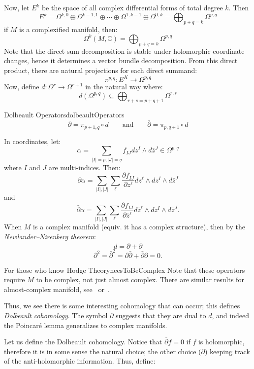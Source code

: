 \documentclass{book}
\newcommand{\C}{{\mathbb{C}}}
\newcommand{\sse}{\subseteq}
\begin{document}
Now, let $E^k$ be the space of all complex differential forms of total degree $k$. Then
\[
  E^k = \Omega^{k,0} \oplus \Omega^{k-1, 1}\oplus \cdots \oplus \Omega^{1, k-1}\oplus \Omega^{0,k}
  = \bigoplus_{p+q=k} \Omega^{p,q}
\]
if $M$ is a complexified manifold, then:
\[
  \Omega^k(M, \C) = \bigoplus_{p+q=k} \Omega^{p,q}
\]
Note that the direct sum decomposition is stable under holomorphic coordinate changes, hence it determines
a vector bundle decomposition. From this direct product, there are natural projections for each direct summand:
\[
  \pi^{p,q}: E^K \to \Omega^{p,q}
\]
Now, define $d: \Omega^r \to \Omega^{r+1}$ in the natural way where:
\[
  d(\Omega^{p,q}) \sse \bigoplus_{r+s=p+q+1} \Omega^{r,s}
\]
\begin{defn}{Dolbeault Operators}{dolbeaultOperators}
  \[
    \partial = \pi_{p+1, q}\circ d \qquad \text{and} \qquad \overline{\partial} = \pi_{p, q+1}\circ d
  \]
\end{defn}
In coordinates, let:
\[
    \alpha = \sum_{|I|=p,|J|=q} f_{IJ} dz^I \wedge d\bar{z}^J \in \Omega^{p,q}
\]
where $I$ and $J$ are multi-indices. Then:
\[
    \partial\alpha = \sum_{|I|,|J|} \sum_\ell \frac{\partial f_{IJ}}{\partial z^\ell} dz^\ell \wedge dz^I \wedge d\bar{z}^J
\]
and
\[
    \bar{\partial}\alpha = \sum_{|I|,|J|} \sum_\ell \frac{\partial f_{IJ}}{\partial\bar{z}^\ell} d\bar{z}^\ell \wedge dz^I \wedge d\bar{z}^J.
\]
When $M$ is a complex manifold (equiv. it has a complex structure), then by the \emph{Newlander–Nirenberg
theorem}:
\[
    d = \partial + \bar{\partial}
\]
\[
    \partial^2 = \bar{\partial}^2 = \partial\bar{\partial} + \bar{\partial}\partial = 0.
\]
\begin{titledBox}{For those who know Hodge Theory}{neesToBeComplex}
  Note that these operators require $M$ to be complex, not just almost complex. There are similar results for
  almost-complex manifold, see~\cite{HodgeTheory2014} or~\cite{hodge1951kahler}.
\end{titledBox}
Thus, we see there is some interesting cohomology that can occur; this defines \emph{Dolbeault cohomology}.
The symbol $\partial$ suggests that they are dual to $d$, and indeed the Poincar\'e lemma generalizes to
complex manifolds.

Let us define the Dolbeault cohomology. Notice that $\overline{\partial}f = 0$ if $f$ is holomorphic,
therefore it is in some sense the natural choice; the other choice ($\partial$) keeping track of the
anti-holomorphic information. Thus, define:
\end{document}
